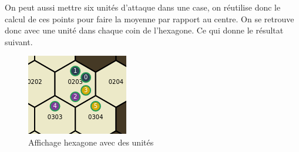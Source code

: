 On peut aussi mettre six unités d'attaque dans une case, on réutilise donc le calcul de ces points pour faire la moyenne par rapport au centre. On se retrouve donc avec une unité dans chaque coin de l'hexagone. Ce qui donne le résultat suivant.

\begin{figure}[H]
    \centering
    \includegraphics[scale=.7]{data/hexagon_with_units.png}
    \caption{Affichage hexagone avec des unités}
    \label{fig:hexagon_with_units}
\end{figure}